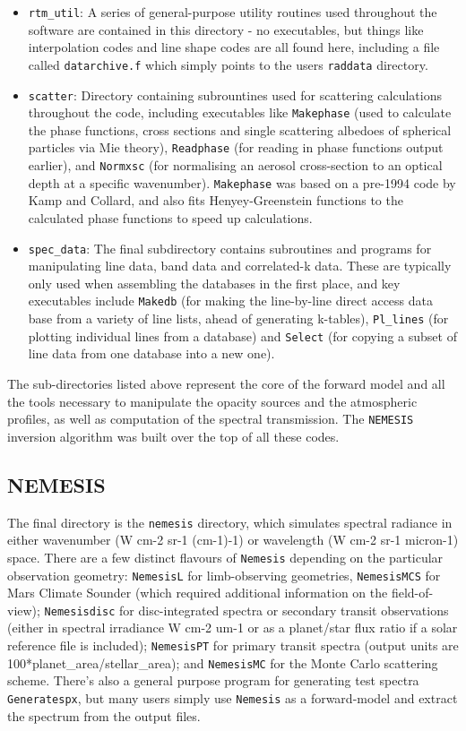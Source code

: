 \documentclass[final,5p,times,twocolumn,authoryear]{elsarticle}
\begin{document}
\begin{itemize}
    \item \verb#rtm_util#: A series of general-purpose utility routines used throughout the software are contained in this directory - no executables, but things like interpolation codes and line shape codes are all found here, including a file called \verb#datarchive.f# which simply points to the users \verb#raddata# directory.
    \item \verb#scatter#: Directory containing subrountines used for scattering calculations throughout the code, including executables like \verb#Makephase# (used to calculate the phase functions, cross sections and single scattering albedoes of spherical particles via Mie theory), \verb#Readphase# (for reading in phase functions output earlier), and \verb#Normxsc# (for normalising an aerosol cross-section to an optical depth at a specific wavenumber).  \verb#Makephase# was based on a pre-1994 code by Kamp and Collard, and also fits Henyey-Greenstein functions to the calculated phase functions to speed up calculations.     
    \item \verb#spec_data#:  The final subdirectory contains subroutines and programs for manipulating line data, band data and correlated-k data.  These are typically only used when assembling the databases in the first place, and key executables include \verb#Makedb# (for making the line-by-line direct access data base from a variety of line lists, ahead of generating k-tables), \verb#Pl_lines# (for plotting individual lines from a database) and \verb#Select# (for copying a subset of line data from one database into a new one).    
\end{itemize}

The sub-directories listed above represent the core of the forward model and all the tools necessary to manipulate the opacity sources and the atmospheric profiles, as well as computation of the spectral transmission.  The \verb#NEMESIS# inversion algorithm was built over the top of all these codes. 

\subsection{NEMESIS}

The final directory is the \verb#nemesis# directory,  which simulates spectral radiance in either wavenumber (W cm-2 sr-1 (cm-1)-1) or wavelength (W cm-2 sr-1 micron-1) space.  There are a few distinct flavours of \verb#Nemesis# depending on the particular observation geometry:  \verb#NemesisL# for limb-observing geometries, \verb#NemesisMCS# for Mars Climate Sounder (which required additional information on the field-of-view); \verb#Nemesisdisc# for disc-integrated spectra or secondary transit observations (either in spectral irradiance W cm-2 um-1 or as a planet/star flux ratio if a solar reference file is included);  \verb#NemesisPT# for primary transit spectra (output units are 100*planet\_area/stellar\_area); and \verb#NemesisMC# for the Monte Carlo scattering scheme.  There's also a general purpose program for generating test spectra \verb#Generatespx#, but many users simply use \verb#Nemesis# as a forward-model and extract the spectrum from the output files.
\end{document}
